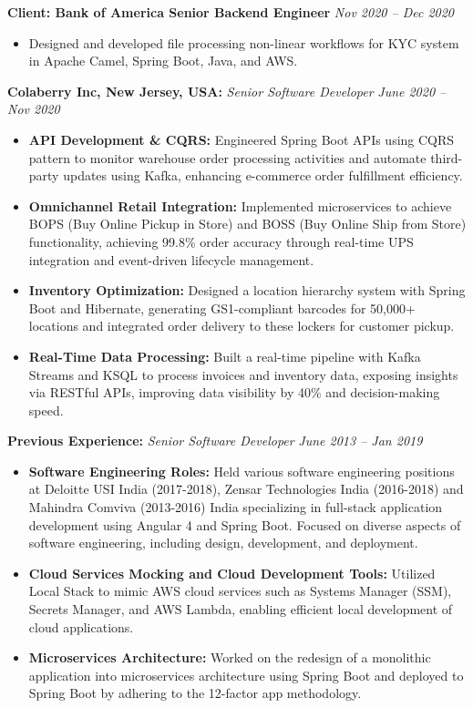 \documentclass[11pt,a4paper]{article}
\newcommand{\resumeItem}[1]{\item[]\small{#1}}
\newcommand{\resumeItemList}[1]{\begin{itemize}[leftmargin=0.5in, itemsep=0.1em, parsep=0pt, partopsep=0pt, topsep=0.15em, label={}, labelsep=0pt]
    \small
    #1
\end{itemize}}
\begin{document}
\vspace{0.2em}
\textbf{Client: Bank of America Senior Backend Engineer} \hfill \textit{Nov 2020 -- Dec 2020}
\resumeItemList{
    \resumeItem{Designed and developed file processing non-linear workflows for KYC system in Apache Camel, Spring Boot, Java, and AWS.}
}

\vspace{0.3em}
\textbf{Colaberry Inc, New Jersey, USA:} \textit{Senior Software Developer} \hfill \textit{June 2020 -- Nov 2020}
\resumeItemList{
    \resumeItem{\textbf{API Development \& CQRS:} Engineered Spring Boot APIs using CQRS pattern to monitor warehouse order processing activities and automate third-party updates using Kafka, enhancing e-commerce order fulfillment efficiency.}
    \resumeItem{\textbf{Omnichannel Retail Integration:} Implemented microservices to achieve BOPS (Buy Online Pickup in Store) and BOSS (Buy Online Ship from Store) functionality, achieving 99.8\% order accuracy through real-time UPS integration and event-driven lifecycle management.}
    \resumeItem{\textbf{Inventory Optimization:} Designed a location hierarchy system with Spring Boot and Hibernate, generating GS1-compliant barcodes for 50,000+ locations and integrated order delivery to these lockers for customer pickup.}
    \resumeItem{\textbf{Real-Time Data Processing:} Built a real-time pipeline with Kafka Streams and KSQL to process invoices and inventory data, exposing insights via RESTful APIs, improving data visibility by 40\% and decision-making speed.}
}

\vspace{0.3em}
\textbf{Previous Experience:} \textit{Senior Software Developer} \hfill \textit{June 2013 -- Jan 2019}
\resumeItemList{
    \resumeItem{\textbf{Software Engineering Roles:} Held various software engineering positions at Deloitte USI India (2017-2018), Zensar Technologies India (2016-2018) and Mahindra Comviva (2013-2016) India specializing in full-stack application development using Angular 4 and Spring Boot. Focused on diverse aspects of software engineering, including design, development, and deployment.}
    \resumeItem{\textbf{Cloud Services Mocking and Cloud Development Tools:} Utilized Local Stack to mimic AWS cloud services such as Systems Manager (SSM), Secrets Manager, and AWS Lambda, enabling efficient local development of cloud applications.}
    \resumeItem{\textbf{Microservices Architecture:} Worked on the redesign of a monolithic application into microservices architecture using Spring Boot and deployed to Spring Boot by adhering to the 12-factor app methodology.}
}
\end{document}

